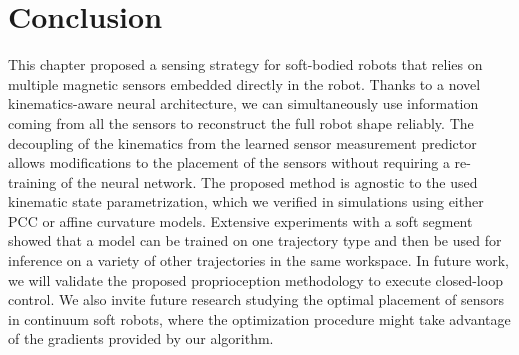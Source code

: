 \section{Conclusion}\label{sec:promasens:conclusion}

This chapter proposed a sensing strategy for soft-bodied robots that relies on multiple magnetic sensors embedded directly in the robot. Thanks to a novel kinematics-aware neural architecture, we can simultaneously use information coming from all the sensors to reconstruct the full robot shape reliably. 
The decoupling of the kinematics from the learned sensor measurement predictor allows modifications to the placement of the sensors without requiring a re-training of the neural network.
The proposed method is agnostic to the used kinematic state parametrization, which we verified in simulations using either \gls{PCC} or affine curvature models.
Extensive experiments with a soft segment showed that a model can be trained on one trajectory type and then be used for inference on a variety of other trajectories in the same workspace.
In future work, we will validate the proposed proprioception methodology to execute closed-loop control. %
We also invite future research studying the optimal placement of sensors in continuum soft robots, where the optimization procedure might take advantage of the gradients provided by our algorithm.

